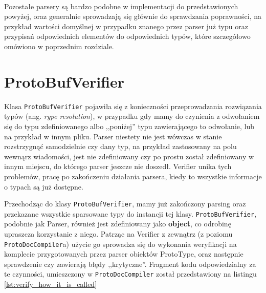 \documentclass[pdflatex,11pt]{aghdpl}
\begin{document}
~\\\*

Pozostałe parsery są bardzo podobne w implementacji do przedstawionych powyżej, oraz generalnie sprowadzają się głównie do sprawdzania poprawności,
na przykład wartości domyślnej w przypadku znanego przez parser już typu oraz przypisań odpowiednich elementów do odpowiednich typów, które szczegółowo omówiono w poprzednim rozdziale.


% 
% 
% 


\section{ProtoBufVerifier}
\label{sec:verifier}
Klasa \verb|ProtoBufVerifier| pojawiła się z konieczności przeprowadzania rozwiązania typów (ang. \textit{rype resolution}),
w przypadku gdy mamy do czynienia z odwołaniem się do typu zdefiniowanego albo ,,poniżej'' typu zawierającego to odwołanie,
lub na przykład w innym pliku. Parser niestety nie jest wówczas w stanie rozstrzygnąć samodzielnie czy dany typ, na przykład zastosowany na polu wewnąrz wiadomości,
jest nie zdefiniowany czy po prostu został zdefiniowany w innym miejscu, do którego parser jeszcze nie doszedł. Verifier unika tych problemów, pracę po zakończeniu 
działania parsera, kiedy to wszystkie informacje o typach są już dostępne.

Przechodząc do klasy \verb|ProtoBufVerifier|, mamy już zakończony parsing oraz przekazane wszystkie sparsowane typy do instancji tej klasy.
\verb|ProtoBufVerifier|, podobnie jak Parser, również jest zdefiniowany jako \textbf{object}, co odrobinę upraszcza korzystanie z niego.
Patrząc na Verifier z zewnątrz (z poziomu \verb|ProtoDocCompiler|a) użycie go sprowadza się do wykonania weryfikacji na komplecie 
przygotowanych przez parser obiektów ProtoType, oraz następnie sprawdzenie czy zawierają błędy ,,krytyczne''. 
Fragment kodu odpowiedzialny za te czynności, umieszczony w \verb|ProtoDocCompiler| został przedstawiony na listingu \ref{lst:verify_how_it_is_called}
\end{document}
